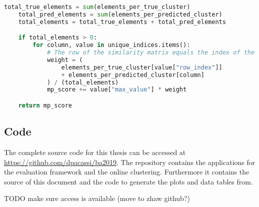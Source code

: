 \begin{lstlisting}[language=Python, caption=Calculate the MP-Score between two clusterings., label={lst:select_max_values}]
    total_true_elements = sum(elements_per_true_cluster)
    total_pred_elements = sum(elements_per_predicted_cluster)
    total_elements = total_true_elements + total_pred_elements

    if total_elements > 0:
        for column, value in unique_indices.items():
            # The row of the similarity matrix equals the index of the true cluster, while the column is the index of the predicted cluster
            weight = (
                elements_per_true_cluster[value["row_index"]]
                + elements_per_predicted_cluster[column]
            ) / (total_elements)
            mp_score += value["max_value"] * weight

    return mp_score
\end{lstlisting}

\subsection{Code}

The complete source code for this thesis can be accessed at \underline{https://github.com/dpacassi/ba2019}. 
The repository contains the applications for the evaluation framework and the online clustering. 
Furthermore it contains the source of this document and the code to generate the plots and data tables from.

TODO make sure access is available (move to zhaw github?)
